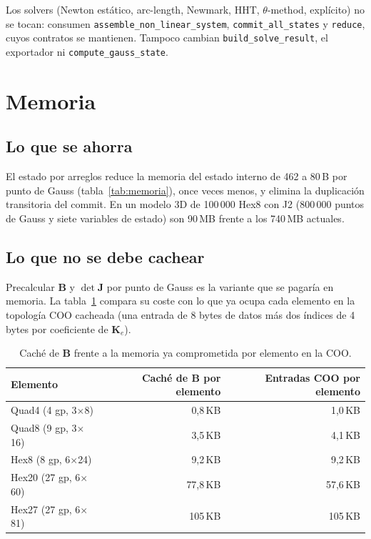 \documentclass[11pt,letterpaper,oneside]{article}
\newcommand{\code}[1]{\texttt{#1}}
\begin{document}
Los solvers (Newton estático, arc-length, Newmark, HHT, $\theta$-method, explícito) no se tocan: consumen \code{assemble\_non\_linear\_system}, \code{commit\_all\_states} y \code{reduce}, cuyos contratos se mantienen. Tampoco cambian \code{build\_solve\_result}, el exportador ni \code{compute\_gauss\_state}.

\section{Memoria}
\label{sec:memoria}

\subsection{Lo que se ahorra}

El estado por arreglos reduce la memoria del estado interno de 462 a 80\,B por punto de Gauss (tabla~\ref{tab:memoria}), once veces menos, y elimina la duplicación transitoria del commit. En un modelo 3D de 100\,000 Hex8 con J2 (800\,000 puntos de Gauss y siete variables de estado) son 90\,MB frente a los 740\,MB actuales.

\subsection{Lo que no se debe cachear}

Precalcular $\mathbf B$ y $\det\mathbf J$ por punto de Gauss es la variante que se pagaría en memoria. La tabla~\ref{tab:bcache} compara su coste con lo que ya ocupa cada elemento en la topología COO cacheada (una entrada de 8 bytes de datos más dos índices de 4 bytes por coeficiente de $\mathbf K_e$).

\begin{table}[h]
\centering
\small
\begin{tabular}{lrr}
\toprule
Elemento & Caché de $\mathbf B$ por elemento & Entradas COO por elemento \\
\midrule
Quad4 (4 gp, 3$\times$8) & 0,8\,KB & 1,0\,KB \\
Quad8 (9 gp, 3$\times$16) & 3,5\,KB & 4,1\,KB \\
Hex8 (8 gp, 6$\times$24) & 9,2\,KB & 9,2\,KB \\
Hex20 (27 gp, 6$\times$60) & 77,8\,KB & 57,6\,KB \\
Hex27 (27 gp, 6$\times$81) & 105\,KB & 105\,KB \\
\bottomrule
\end{tabular}
\caption{Caché de $\mathbf B$ frente a la memoria ya comprometida por elemento en la COO.}
\label{tab:bcache}
\end{table}
\end{document}
